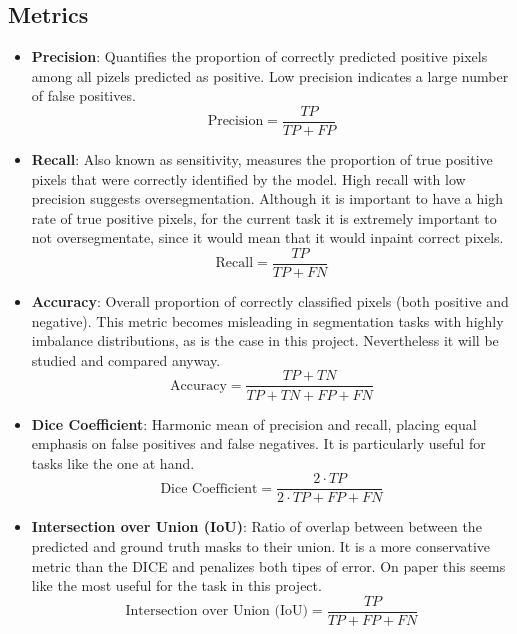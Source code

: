 \documentclass[openany, 12pt]{article}
\begin{document}
\subsection{Metrics}
\begin{itemize}
	\item \textbf{Precision}: Quantifies the proportion of correctly predicted positive pixels among all pizels predicted as positive. Low precision indicates a large number of false positives.  
	\begin{equation*}
		\text{Precision} = \frac{TP}{TP + FP}
	\end{equation*}
	\item \textbf{Recall}: Also known as sensitivity, measures the proportion of true positive pixels that were correctly identified by the model. High recall with low precision suggests oversegmentation. Although it is important to have a high rate of true positive pixels, for the current task it is extremely important to not oversegmentate, since it would mean that it would inpaint correct pixels.
	\begin{equation*}
		\text{Recall} = \frac{TP}{TP + FN}
	\end{equation*}
	\item \textbf{Accuracy}: Overall proportion of correctly classified pixels (both positive and negative). This metric becomes misleading in segmentation tasks with highly imbalance distributions, as is the case in this project. Nevertheless it will be studied and compared anyway. 
	\begin{equation*}
		\text{Accuracy} = \frac{TP + TN}{TP + TN + FP + FN}
	\end{equation*}
	\item \textbf{Dice Coefficient}: Harmonic mean of precision and recall, placing equal emphasis on false positives and false negatives. It is particularly useful for tasks like the one at hand.
	\begin{equation*}
		\text{Dice Coefficient} = \frac{2 \cdot TP}{2 \cdot TP + FP + FN}
	\end{equation*}
	\item \textbf{Intersection over Union (IoU)}: Ratio of overlap between between the predicted and ground truth masks to their union. It is a more conservative metric than the DICE and penalizes both tipes of error. On paper this seems like the most useful for the task in this project.
	\begin{equation*}
		\text{Intersection over Union (IoU)} = \frac{TP}{TP + FP + FN}
	\end{equation*}

\end{itemize}
\newpage
\end{document}
